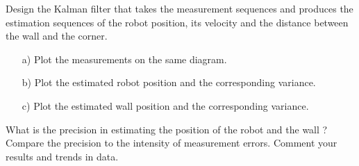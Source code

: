 \documentclass{article}
\begin{document}
Design the Kalman filter that takes the measurement sequences and produces the estimation sequences of the robot position, its velocity and the distance between the wall and the corner.
\begin{itemize}
\item[a)] Plot the measurements on the same diagram. 
\item[b)] Plot the estimated robot position and the corresponding variance. 
\item[c)] Plot the estimated wall position and the corresponding variance. 
\end{itemize}
What is the precision in estimating the position of the robot and the wall ?
Compare the precision to the intensity of measurement errors. Comment your
results and trends in data.
\end{document}
